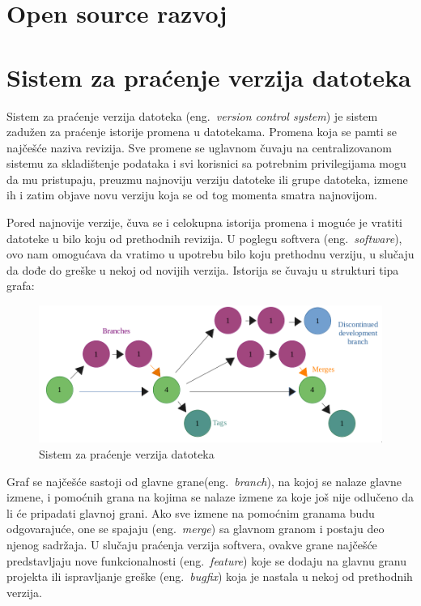 \documentclass[12pt]{report}
\begin{document}
\section{Open source razvoj}
\section{Sistem za praćenje verzija datoteka}
Sistem za praćenje verzija datoteka (eng.\ \textit{version control system}) je sistem zadužen za praćenje istorije promena u datotekama. Promena koja se pamti se najčešće naziva revizija. Sve promene se uglavnom čuvaju na centralizovanom sistemu za skladištenje podataka i svi korisnici sa potrebnim privilegijama mogu da mu pristupaju, preuzmu najnoviju verziju datoteke ili grupe datoteka, izmene ih i zatim objave novu verziju koja se od tog momenta smatra najnovijom.

Pored najnovije verzije, čuva se i celokupna istorija promena i moguće je vratiti datoteke u bilo koju od prethodnih revizija. U poglegu softvera (eng.\ \textit{software}), ovo nam omogućava da vratimo u upotrebu bilo koju prethodnu verziju, u slučaju da dođe do greške u nekoj od novijih verzija. Istorija se čuvaju u strukturi tipa grafa:

\begin{figure}[H]
    \includegraphics[width=\linewidth]{images/version_control.png}
    \caption{Sistem za praćenje verzija datoteka}
\end{figure}

Graf se najčešće sastoji od glavne grane(eng.\ \textit{branch}), na kojoj se nalaze glavne izmene, i pomoćnih grana na kojima se nalaze izmene za koje još nije odlučeno da li će pripadati glavnoj grani. Ako sve izmene na pomoćnim granama budu odgovarajuće, one se spajaju (eng.\ \textit{merge}) sa glavnom granom i postaju deo njenog sadržaja. U slučaju praćenja verzija softvera, ovakve grane najčešće predstavljaju nove funkcionalnosti (eng.\ \textit{feature}) koje se dodaju na glavnu granu projekta ili ispravljanje greške (eng.\ \textit{bugfix}) koja je nastala u nekoj od prethodnih verzija.
\end{document}
